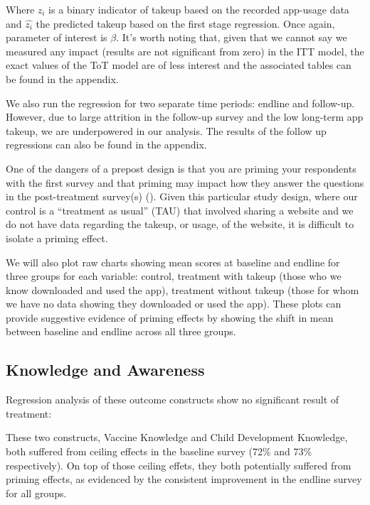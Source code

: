 \documentclass{article}
\begin{document}
Where $z_i$ is a binary indicator of takeup based on the recorded app-usage data and $\hat{z_i}$ the predicted takeup based on the first stage regression. Once again, parameter of interest is $\beta$. It's worth noting that, given that we cannot say we measured any impact (results are not significant from zero) in the ITT model, the exact values of the ToT model are of less interest and the associated tables can be found in the appendix.

We also run the regression for two separate time periods: endline and follow-up. However, due to large attrition in the follow-up survey and the low long-term app takeup, we are underpowered in our analysis. The results of the follow up regressions can also be found in the appendix.

One of the dangers of a prepost design is that you are priming your respondents with the first survey and that priming may impact how they answer the questions in the post-treatment survey(s) (\cite{Stantcheva2023}). Given this particular study design, where our control is a ``treatment as usual'' (TAU) that involved sharing a website and we do not have data regarding the takeup, or usage, of the website, it is difficult to isolate a priming effect.

We will also plot raw charts showing mean scores at baseline and endline for three groups for each variable: control, treatment with takeup (those who we know downloaded and used the app), treatment without takeup (those for whom we have no data showing they downloaded or used the app). These plots can provide suggestive evidence of priming effects by showing the shift in mean between baseline and endline across all three groups.

\subsection*{Knowledge and Awareness}

Regression analysis of these outcome constructs show no significant result of treatment:



These two constructs, Vaccine Knowledge and Child Development Knowledge, both suffered from ceiling effects in the baseline survey (72\% and 73\% respectively). On top of those ceiling effets, they both potentially suffered from priming effects, as evidenced by the consistent improvement in the endline survey for all groups.
\end{document}
